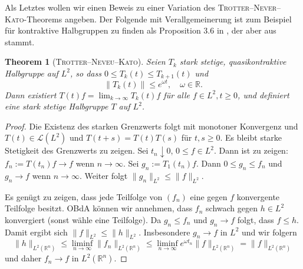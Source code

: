 \documentclass[11pt,twoside,a4paper]{article}
\newtheorem{thm}{Theorem}
\theoremstyle{break}
\begin{document}
Als Letztes wollen wir einen Beweis zu einer Variation des \textsc{Trotter--Never--Kato}-Theorems angeben.  Der Folgende mit Verallgemeinerung ist zum Beispiel für kontraktive Halbgruppen zu finden als Proposition 3.6 in \cite{arendt-goldstein}, der aber aus \cite{voigt} stammt.

\vspace{.25cm}

\begin{thm}[\textsc{Trotter--Neveu--Kato}]
Seien $T_k$ stark stetige, quasikontraktive Halbgruppe  auf $L^2$, so dass $0\le T_k(t) \le T_{k+1}(t)$ und
\begin{equation}
\|T_k(t)\|\le e^{\omega t},\quad \omega \in \mathbb R.
\end{equation}  
Dann existiert $T(t)f=\lim_{k\to \infty} T_k(t)f$ für alle $f\in L^2, t\ge 0$, und definiert eine stark stetige Halbgruppe $T$ auf $L^2$. 
\end{thm}

\begin{proof}
Die Existenz des starken Grenzwerts folgt mit monotoner Konvergenz und $T(t)\in \mathcal L(L^2)$ und $T(t+s)=T(t) T(s)$ für $t,s\ge 0$.  Es bleibt starke Stetigkeit des Grenzwerts zu zeigen.  Sei $t_n\downarrow 0$, $0\le f\in L^2$.  Dann ist zu zeigen: $f_n:=T(t_n)f\to f$ wenn $n\to \infty$. Sei $g_n:=T_1(t_n) f$. Dann $0\le g_n \le f_n$ und $g_n \to f$ wenn $n\to \infty$. Weiter folgt $\|g_n\|_{L^2} \le \|f\|_{L^2}$.

Es genügt zu zeigen, dass jede Teilfolge von $(f_n)$ eine gegen $f$ konvergente Teilfolge besitzt.  OBdA können wir annehmen, dass $f_n$ schwach gegen $h\in L^2$ konvergiert (sonst wähle eine Teilfolge).  Da $g_n \le f_n$ und $g_n \to f$ folgt, dass $f\le h$.  Damit ergibt sich $\| f\|_{L^2}\le \|h\|_{L^2}$. 
Insbesondere $g_n \to f$ in $L^2$ und wir folgern
\begin{equation}
\| h\|_{L^2(\mathbb R^n)}  \le \liminf_{n\to \infty} \| f_n\|_{L^2(\mathbb R^n)}\le \liminf_{n\to \infty} e^{\omega t_n} \|f\|_{L^2(\mathbb R^n)}=\| f\|_{L^2(\mathbb R^n)}
\end{equation}
und daher $f_n\to f$ in $L^2(\mathbb R^n)$.
\end{proof}
 
\end{document}
